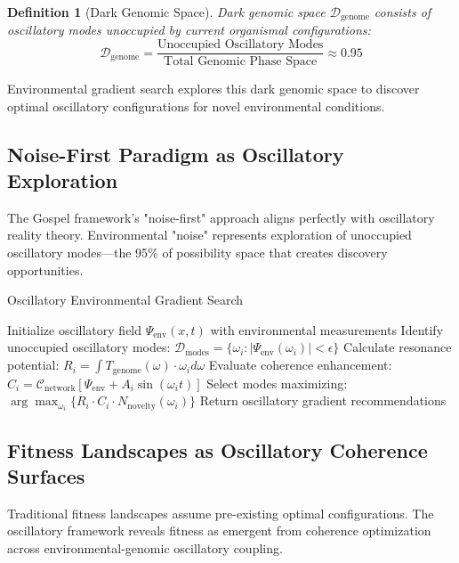 \documentclass[12pt,a4paper]{article}
\newtheorem{definition}[theorem]{Definition}
\begin{document}
\begin{definition}[Dark Genomic Space]
Dark genomic space $\mathcal{D}_{\text{genome}}$ consists of oscillatory modes unoccupied by current organismal configurations:
$$\mathcal{D}_{\text{genome}} = \frac{\text{Unoccupied Oscillatory Modes}}{\text{Total Genomic Phase Space}} \approx 0.95$$
\end{definition}

Environmental gradient search explores this dark genomic space to discover optimal oscillatory configurations for novel environmental conditions.

\subsection{Noise-First Paradigm as Oscillatory Exploration}

The Gospel framework's "noise-first" approach aligns perfectly with oscillatory reality theory. Environmental "noise" represents exploration of unoccupied oscillatory modes—the 95\% of possibility space that creates discovery opportunities.

\begin{algorithm}[H]
\caption{Oscillatory Environmental Gradient Search}
\begin{algorithmic}[1]
\State Initialize oscillatory field $\Psi_{\text{env}}(x,t)$ with environmental measurements
\State Identify unoccupied oscillatory modes: $\mathcal{D}_{\text{modes}} = \{\omega_i : |\Psi_{\text{env}}(\omega_i)| < \epsilon\}$
    \State Calculate resonance potential: $R_i = \int T_{\text{genome}}(\omega) \cdot \omega_i d\omega$
    \State Evaluate coherence enhancement: $C_i = \mathcal{C}_{\text{network}}[\Psi_{\text{env}} + A_i \sin(\omega_i t)]$
\EndFor
\State Select modes maximizing: $\arg\max_{\omega_i} \{R_i \cdot C_i \cdot N_{\text{novelty}}(\omega_i)\}$
\State Return oscillatory gradient recommendations
\end{algorithmic}
\end{algorithm}

\subsection{Fitness Landscapes as Oscillatory Coherence Surfaces}

Traditional fitness landscapes assume pre-existing optimal configurations. The oscillatory framework reveals fitness as emergent from coherence optimization across environmental-genomic oscillatory coupling.
\end{document}
